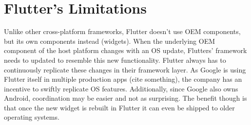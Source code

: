\section{Flutter's Limitations}
Unlike other cross-platform frameworks, Flutter doesn't use OEM components, but its own components instead (widgets).
When the underlying OEM component of the host platform changes with an OS update, Flutters' framework needs to updated to resemble this new 
functionality. Flutter always has to continuously replicate these changes in their framework layer. As Google is using Flutter itself in multiple 
production apps (cite something), the company has an incentive to swiftly replicate OS features. Additionally, since Google also owns Android, 
coordination may be easier and not as surprising.
The benefit though is that once the new widget is rebuilt in Flutter it can even be shipped to older operating systems.
